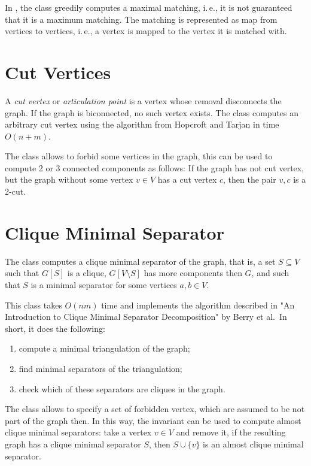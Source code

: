 \documentclass[a4paper, ukenglish, twoside, openright]{jdrasilmanual}
\begin{document}
In \Jdrasil, the class  greedily computes a maximal matching, i.\,e., it is not
guaranteed that it is a maximum matching. The matching is represented
as map from vertices to vertices, i.\,e., a vertex is mapped to the
vertex it is matched with.

\section{Cut Vertices}
A \emph{cut vertex} or \emph{articulation point} is a vertex whose removal
disconnects the graph. If the graph is biconnected, no such vertex
exists. The class  computes an arbitrary cut vertex using the
algorithm from Hopcroft and Tarjan in time $O(n+m)$.
 
The class allows to forbid some vertices in the graph, this can be used
to compute 2 or 3 connected components as follows: If the graph has not
cut vertex, but the graph without some vertex \(v\in V\) has a cut
vertex \(c\), then the pair \(v,c\) is a 2-cut.

\section{Clique Minimal Separator}
The class  computes a clique minimal separator of the graph, that is, a set
\(S\subseteq V\) such that \(G[S]\) is a clique, \(G[V\setminus S]\)
has more components then $G$, and such that \(S\) is a minimal separator
for some vertices \(a,b\in V\).
 
This class takes \(O(nm)\) time and implements the algorithm described
in "An Introduction to Clique Minimal Separator Decomposition" by
Berry et al.\, In short, it does the following:
\begin{enumerate}
  \item compute a minimal triangulation of the graph;
  \item find minimal separators of the triangulation;
  \item check which of these separators are cliques in the graph.
 \end{enumerate}
 The class allows to specify a set of forbidden vertex, which are
 assumed to be not part of the graph then. In this way, the invariant
 can be used to compute almost clique minimal separators: take a
 vertex \(v\in V\) and remove it, if the resulting graph has a clique
 minimal separator \(S\), then \(S\cup\{v\}\) is an almost clique
 minimal separator.
\end{document}
